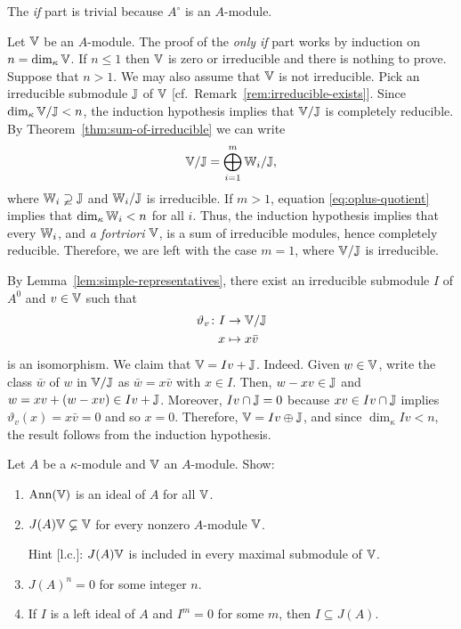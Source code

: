 \begin{solution}
    The \textit{if\/} part is trivial because $A^\circ$ is an $A$-module.
    
    Let $\mathbb V$ be an $A$-module. The proof of the \textit{only if\/} part works by induction on $n=\dim_\kappa\mathbb V$. If $n\le1$ then $\mathbb V$ is zero or irreducible and there is nothing to prove. Suppose that $n>1$. We may also assume that $\mathbb V$ is not irreducible. Pick an irreducible submodule $\mathbb J$ of $\mathbb V$ [cf.~Remark~\ref{rem:irreducible-exists}]. Since $\dim_\kappa\mathbb V/\mathbb J<n$, the induction hypothesis implies that $\mathbb V/\mathbb J$ is completely reducible. By Theorem~\ref{thm:sum-of-irreducible} we can write
    \begin{equation}\label{eq:oplus-quotient}
        \mathbb V/\mathbb J = \bigoplus_{i=1}^m\mathbb W_i/\mathbb J,
    \end{equation}
    where $\mathbb W_i\varsupsetneq\mathbb J$ and $\mathbb W_i/\mathbb J$ is irreducible. If $m>1$, equation \eqref{eq:oplus-quotient} implies that $\dim_\kappa\mathbb W_i<n$ for all $i$. Thus, the induction hypothesis implies that every $\mathbb W_i$, and \textit{a fortriori} $\mathbb V$, is a sum of irreducible modules, hence completely reducible. Therefore, we are left with the case $m=1$, where $\mathbb V/\mathbb J$ is irreducible.

    By Lemma~\ref{lem:simple-representatives}, there exist an irreducible submodule $I$ of $A^0$ and $v\in\mathbb V$ such that
    \begin{align*}
        \vartheta_v\colon I&\to\mathbb V/\mathbb J\\
        x&\mapsto x\bar v
    \end{align*}
    is an isomorphism. We claim that $\mathbb V=Iv+\mathbb J$. Indeed. Given $w\in\mathbb V$, write the class $\bar w$ of $w$ in $\mathbb V/\mathbb J$ as $\bar w=x\bar v$ with $x\in I$. Then, $w-xv\in\mathbb J$ and $w=xv+(w-xv)\in Iv+\mathbb J$. Moreover, $Iv\cap\mathbb J=0$ because $xv\in Iv\cap\mathbb J$ implies $\vartheta_v(x)=x\bar v=0$ and so $x=0$. Therefore, $\mathbb V=Iv\oplus\mathbb J$, and since $\dim_\kappa Iv<n$, the result follows from the induction hypothesis.
\end{solution}

\begin{probl}\label{probl:Ann(V)}
    Let\/ $A$ be a\/ $\kappa$-module and\/ $\mathbb V$ an\/ $A$-module. Show:
    \begin{enumerate}[\rm a)]
        \item $\operatorname{\operatorname{Ann}}(\mathbb V)$ is an ideal of\/ $A$ for all\/ $\mathbb V$.
        \item $J(A)\mathbb V\varsubsetneq\mathbb V$ for every nonzero\/ $A$-module\/ $\mathbb V$.
        
        \textrm{\rm Hint [l.c.]: $J(A)\mathbb V$ is included in every maximal submodule of $\mathbb V$.}
        \item $J(A)^n = 0$ for some integer\/ $n$.
        \item If\/ $I$ is a left ideal of\/ $A$ and\/ $I^m = 0$ for some\/ $m$, then\/ $I \subseteq J(A)$.
    \end{enumerate}
\end{probl}

